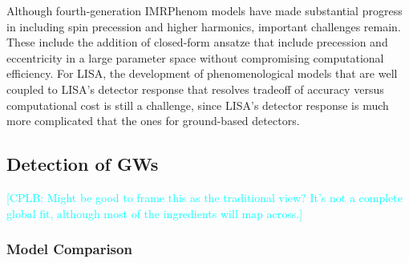 \documentclass[a4paper,12pt]{article}
\newcommand{\cplb}[1]{\textcolor{cyan}{[CPLB: #1]}}
\begin{document}
Although fourth-generation IMRPhenom models have made substantial progress in including spin precession and higher harmonics, important challenges remain. These include the addition of closed-form ansatze that include precession and eccentricity in a large parameter space without compromising computational efficiency\cite{estelles2022time,afshordi2023waveform}. For LISA, the development of phenomenological models that are well coupled to LISA's detector response that resolves tradeoff of accuracy versus computational cost is still a challenge\cite{afshordi2023waveform,valencia2025accelerating}, since LISA's detector response is much more complicated that the ones for ground-based detectors.

\subsection{Detection of GWs}
\label{subsec:DetectionGWs}

\cplb{Might be good to frame this as the traditional view? It's not a complete global fit, although most of the ingredients will map across.}

\subsubsection{Model Comparison}
\label{subsubsec:ModelComp}
\end{document}
